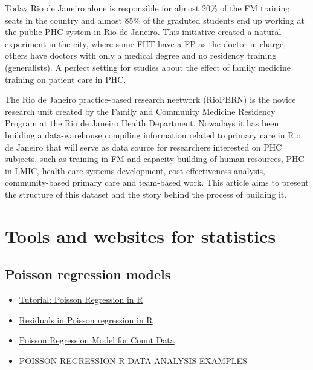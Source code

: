 \documentclass[]{book}
\begin{document}
Today Rio de Janeiro alone is responsible for almost 20\% of the FM training seats in the country and almost 85\% of the graduted students end up working at the public PHC system in Rio de Janeiro. This initiative created a natural experiment in the city, where some FHT have a FP as the doctor in charge, others have doctors with only a medical degree and no residency training (generalists). A perfect setting for studies about the effect of family medicine training on patient care in PHC.

The Rio de Janeiro practice-based research neetwork (RioPBRN) is the novice research unit created by the Family and Community Medicine Residency Program at the Rio de Janeiro Health Department. Nowadays it has been building a data-warehouse compiling information related to primary care in Rio de Janeiro that will serve as data source for researchers interested on PHC subjects, such as training in FM and capacity building of human resources, PHC in LMIC, health care systems development, cost-effectiveness analysis, community-based primary care and team-based work. This article aims to present the structure of this dataset and the story behind the process of building it.

\hypertarget{tools-and-websites-for-statistics}{%
\chapter*{Tools and websites for statistics}\label{tools-and-websites-for-statistics}}

\hypertarget{poisson-regression-models}{%
\section*{Poisson regression models}\label{poisson-regression-models}}

\begin{itemize}
\item
  \href{https://www.dataquest.io/blog/tutorial-poisson-regression-in-r/}{Tutorial: Poisson Regression in R}
\item
  \href{https://stats.stackexchange.com/questions/360158/residuals-in-poisson-regression-in-r}{Residuals in Poisson regression in R}
\item
  \href{https://online.stat.psu.edu/stat504/node/169/}{Poisson Regression Model for Count Data}
\item
  \href{https://stats.idre.ucla.edu/r/dae/poisson-regression/}{POISSON REGRESSION \textbar{} R DATA ANALYSIS EXAMPLES}
\end{itemize}
\end{document}
